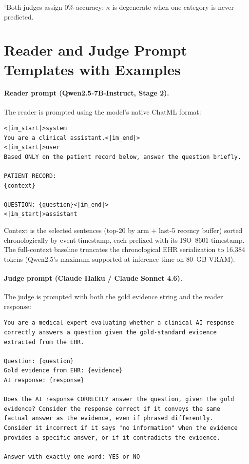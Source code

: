 \documentclass{article}
\begin{document}
$^\dagger$Both judges assign 0\% accuracy; $\kappa$ is degenerate when one
category is never predicted.


\section{Reader and Judge Prompt Templates with Examples}
\label{app:prompts}

\paragraph{Reader prompt (Qwen2.5-7B-Instruct, Stage 2).}
The reader is prompted using the model's native ChatML format:

\begin{verbatim}
<|im_start|>system
You are a clinical assistant.<|im_end|>
<|im_start|>user
Based ONLY on the patient record below, answer the question briefly.

PATIENT RECORD:
{context}

QUESTION: {question}<|im_end|>
<|im_start|>assistant
\end{verbatim}

Context is the selected sentences (top-20 by arm $+$ last-5 recency buffer)
sorted chronologically by event timestamp, each prefixed with its ISO~8601
timestamp. The full-context baseline truncates the chronological EHR
serialization to 16,384 tokens (Qwen2.5's maximum supported at inference
time on 80~GB VRAM).

\paragraph{Judge prompt (Claude Haiku / Claude Sonnet 4.6).}
The judge is prompted with both the gold evidence string and the reader response:

\begin{verbatim}
You are a medical expert evaluating whether a clinical AI response
correctly answers a question given the gold-standard evidence
extracted from the EHR.

Question: {question}
Gold evidence from EHR: {evidence}
AI response: {response}

Does the AI response CORRECTLY answer the question, given the gold
evidence? Consider the response correct if it conveys the same
factual answer as the evidence, even if phrased differently.
Consider it incorrect if it says "no information" when the evidence
provides a specific answer, or if it contradicts the evidence.

Answer with exactly one word: YES or NO
\end{verbatim}
\end{document}
